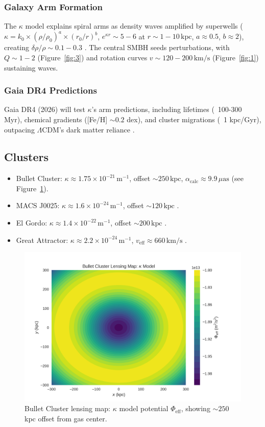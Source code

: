 \documentclass[a4paper,12pt]{article}
\begin{document}
\subsubsection{Galaxy Arm Formation}
The $\kappa$ model explains spiral arms as density waves amplified by superwells ($\kappa = k_0 \times (\rho/\rho_0)^a \times (r_0/r)^b$, $e^{\kappa r} \sim 5-6$ at $r \sim 1-10 \, \text{kpc}$, $a \approx 0.5$, $b \approx 2$), creating $\delta\rho/\rho \sim 0.1-0.3$ \citep{Lin1964}. The central SMBH seeds perturbations, with $Q \sim 1-2$ (Figure~\ref{fig:3}) and rotation curves $v \sim 120-200 \, \text{km/s}$ (Figure~\ref{fig:1}) sustaining waves.

\subsubsection{Gaia DR4 Predictions}
Gaia DR4 (2026) will test $\kappa$’s arm predictions, including lifetimes (~100-300 Myr), chemical gradients ([Fe/H] $\sim 0.2$ dex), and cluster migrations (~1 kpc/Gyr), outpacing $\Lambda$CDM’s dark matter reliance \citep{Carnall2024}.

\subsection{Clusters}
\begin{itemize}
    \item Bullet Cluster: $\kappa \approx 1.75 \times 10^{-21} \, \text{m}^{-1}$, offset $\sim 250 \, \text{kpc}$, $\alpha_{\text{calc}} \approx 9.9 \, \mu\text{as}$ \citep{Clowe2006} (see Figure~\ref{fig:5}).
    \item MACS J0025: $\kappa \approx 1.6 \times 10^{-24} \, \text{m}^{-1}$, offset $\sim 120 \, \text{kpc}$ \citep{Bradač2008}.
    \item El Gordo: $\kappa \approx 1.4 \times 10^{-22} \, \text{m}^{-1}$, offset $\sim 200 \, \text{kpc}$ \citep{Jee2014}.
    \item Great Attractor: $\kappa \approx 2.2 \times 10^{-24} \, \text{m}^{-1}$, $v_\text{eff} \approx 660 \, \text{km/s}$ \citep{Dressler1987}.
\end{itemize}
\begin{figure}[H]
    \centering
    \includegraphics[width=0.8\linewidth]{figure5.png}
    \caption{Bullet Cluster lensing map: $\kappa$ model potential $\Phi_{\mathrm{eff}}$, showing $\sim 250$ kpc offset from gas center.}
    \label{fig:5}
\end{figure}
\end{document}
